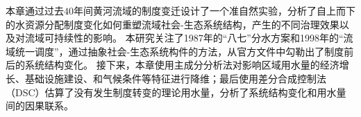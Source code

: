 

本章通过过去$40$年间黄河流域的制度变迁设计了一个准自然实验，分析了自上而下的水资源分配制度变化如何重塑流域社会-生态系统结构，产生的不同治理效果以及对流域可持续性的影响。
本研究关注了1987年的“八七”分水方案和1998年的“流域统一调度”，通过抽象社会-生态系统构件的方法，从官方文件中勾勒出了制度前后的系统结构变化。
接下来，本章使用主成分分析法对影响区域用水量的经济增长、基础设施建设、和气候条件等特征进行降维；最后使用差分合成控制法（DSC）\cite{arkhangelsky2021}估算了没有发生制度转变的理论用水量，分析了系统结构变化和用水量间的因果联系。
